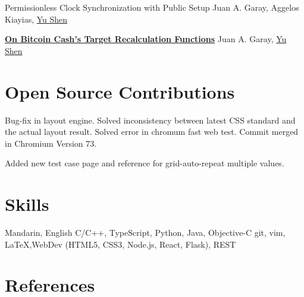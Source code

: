 \documentclass[11pt,a4paper,sans]{moderncv}
\begin{document}
{Permissionless Clock Synchronization with Public Setup}
{}
{}
{}
{\normalsize Juan A. Garay, Aggelos Kiayias, \underline{Yu Shen}}

{\textbf{\href{https://www.youtube.com/watch?v=5K6HNCtLPtk}{On Bitcoin Cash's Target Recalculation Functions}}}
{}
{}
{}
{\normalsize Juan A. Garay, \underline{Yu Shen}}

\section{Open Source Contributions}

{Bug-fix in layout engine. Solved inconsistency between latest CSS standard and the actual layout result. Solved error in chromum fast web test. Commit merged in Chromium Version 73.}

{Added new test case page and reference for grid-auto-repeat multiple values.}


\section{Skills}

{Mandarin, English}
{C/C++, TypeScript, Python, Java, Objective-C}
{git, vim, \LaTeX,WebDev (HTML5, CSS3, Node.js, React, Flask), REST}


\section{References}

\end{document}
